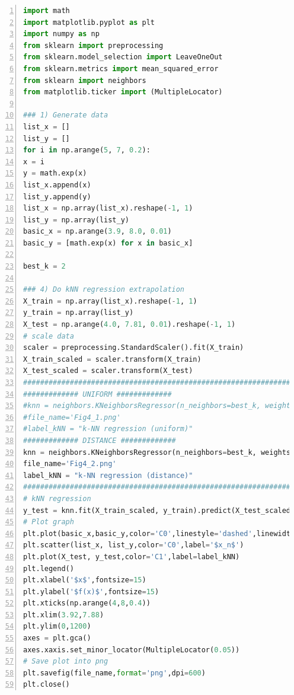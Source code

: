 \documentclass{article}%
\begin{document}
\begin{lstlisting}[language=Python, caption=Code3,backgroundcolor=\color{lightgrey},keywordstyle=\color{darkgreen},commentstyle=\color{red},
showspaces=false,numbers=left,stringstyle=\color{purple}]
import math
import matplotlib.pyplot as plt
import numpy as np
from sklearn import preprocessing
from sklearn.model_selection import LeaveOneOut
from sklearn.metrics import mean_squared_error
from sklearn import neighbors
from matplotlib.ticker import (MultipleLocator)

### 1) Generate data
list_x = []
list_y = []
for i in np.arange(5, 7, 0.2):
x = i
y = math.exp(x)
list_x.append(x)
list_y.append(y)
list_x = np.array(list_x).reshape(-1, 1)
list_y = np.array(list_y)
basic_x = np.arange(3.9, 8.0, 0.01)
basic_y = [math.exp(x) for x in basic_x]

best_k = 2

### 4) Do kNN regression extrapolation
X_train = np.array(list_x).reshape(-1, 1)
y_train = np.array(list_y)
X_test = np.arange(4.0, 7.81, 0.01).reshape(-1, 1)
# scale data
scaler = preprocessing.StandardScaler().fit(X_train)
X_train_scaled = scaler.transform(X_train)
X_test_scaled = scaler.transform(X_test)
################################################################################
############# UNIFORM #############
#knn = neighbors.KNeighborsRegressor(n_neighbors=best_k, weights='uniform')
#file_name='Fig4_1.png'
#label_kNN = "k-NN regression (uniform)"
############# DISTANCE #############
knn = neighbors.KNeighborsRegressor(n_neighbors=best_k, weights='distance')
file_name='Fig4_2.png'
label_kNN = "k-NN regression (distance)"
################################################################################
# kNN regression
y_test = knn.fit(X_train_scaled, y_train).predict(X_test_scaled)
# Plot graph
plt.plot(basic_x,basic_y,color='C0',linestyle='dashed',linewidth=1)
plt.scatter(list_x, list_y,color='C0',label='$x_n$')
plt.plot(X_test, y_test,color='C1',label=label_kNN)
plt.legend()
plt.xlabel('$x$',fontsize=15)
plt.ylabel('$f(x)$',fontsize=15)
plt.xticks(np.arange(4,8,0.4))
plt.xlim(3.92,7.88)
plt.ylim(0,1200)
axes = plt.gca()
axes.xaxis.set_minor_locator(MultipleLocator(0.05))
# Save plot into png
plt.savefig(file_name,format='png',dpi=600)
plt.close()
\end{lstlisting}
\end{document}
